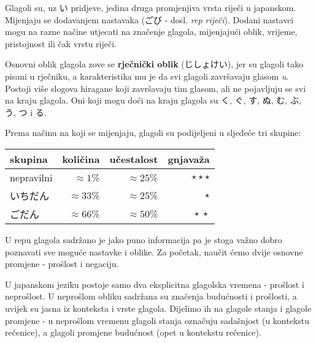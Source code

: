 	
	
	Glagoli su, uz い pridjeve, jedina druga promjenjiva vrsta riječi u japanskom. Mijenjaju se dodavanjem nastavaka (ごび - dosl. \textit{rep riječi}). Dodani nastavci mogu na razne načine utjecati na značenje glagola, mijenjajući oblik, vrijeme, pristojnost ili čak vrstu riječi.
	
	Osnovni oblik glagola zove se \textbf{rječnički oblik} (じしょけい), jer su glagoli tako pisani u rječniku, a karakteristika mu je da svi glagoli završavaju glasom \textit{u}. Postoji više slogova hiragane koji završavaju tim glasom, ali ne pojavljuju se svi na kraju glagola. Oni koji mogu doći na kraju glagola su く, ぐ, す, ぬ, む, ぶ, う, つ i る.
	
	Prema načinu na koji se mijenjaju, glagoli su podijeljeni u sljedeće tri skupine:
	
	\begin{table}[h]
		\centering
		\begin{tabular}{l r r r}\toprule[2pt]
			skupina & količina & učestalost & gnjavaža\\
			\midrule
			nepravilni & $\approx 1$\% & $\approx 25$\% & $\star\star\star$\\
			いちだん\footnotemark[1] & $\approx 33$\% & $\approx 25$\% & $\star$\\
			ごだん\footnotemark[1] & $\approx 66$\% & $\approx 50$\% & $\star\:\star$\\
			\bottomrule[2pt]
		\end{tabular}
	\end{table}


	U repu glagola sadržano je jako puno informacija pa je stoga važno dobro poznavati sve moguće nastavke i oblike. Za početak, naučit ćemo dvije osnovne promjene - prošlost i negaciju.
	
	
	U japanskom jeziku postoje samo dva eksplicitna glagolska vremena - prošlost i neprošlost. U neprošlom obliku sadržana su značenja budućnosti i prošlosti, a uvijek su jasna iz konteksta i vrste glagola. Dijelimo ih na glagole stanja i glagole promjene - u neprošlom vremenu glagoli stanja označuju sadašnjost (u kontekstu rečenice), a glagoli promjene budućnost (opet u kontekstu rečenice).
	

